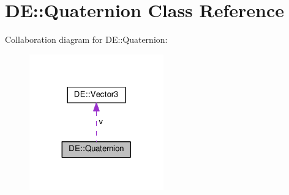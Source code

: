 \hypertarget{classDE_1_1Quaternion}{}\section{DE\+:\+:Quaternion Class Reference}
\label{classDE_1_1Quaternion}


Collaboration diagram for DE\+:\+:Quaternion\+:\nopagebreak
\begin{figure}[H]
\begin{center}
\leavevmode
\includegraphics[width=164pt]{classDE_1_1Quaternion__coll__graph}
\end{center}
\end{figure}
